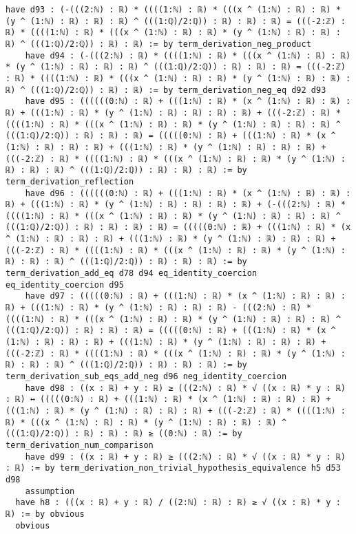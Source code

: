 \documentclass{article}
\begin{document}
\begin{tcolorbox}[colback=white!10, width=\linewidth]
\begin{lstlisting}[language=Lean4]
    have d93 : (-(((2:ℕ) : ℝ) * ((((1:ℕ) : ℝ) * (((x ^ (1:ℕ) : ℝ) : ℝ) * (y ^ (1:ℕ) : ℝ) : ℝ) : ℝ) ^ (((1:ℚ)/2:ℚ)) : ℝ) : ℝ) : ℝ) = (((-2:ℤ) : ℝ) * ((((1:ℕ) : ℝ) * (((x ^ (1:ℕ) : ℝ) : ℝ) * (y ^ (1:ℕ) : ℝ) : ℝ) : ℝ) ^ (((1:ℚ)/2:ℚ)) : ℝ) : ℝ) := by term_derivation_neg_product
    have d94 : (-(((2:ℕ) : ℝ) * ((((1:ℕ) : ℝ) * (((x ^ (1:ℕ) : ℝ) : ℝ) * (y ^ (1:ℕ) : ℝ) : ℝ) : ℝ) ^ (((1:ℚ)/2:ℚ)) : ℝ) : ℝ) : ℝ) = (((-2:ℤ) : ℝ) * ((((1:ℕ) : ℝ) * (((x ^ (1:ℕ) : ℝ) : ℝ) * (y ^ (1:ℕ) : ℝ) : ℝ) : ℝ) ^ (((1:ℚ)/2:ℚ)) : ℝ) : ℝ) := by term_derivation_neg_eq d92 d93
    have d95 : ((((((0:ℕ) : ℝ) + (((1:ℕ) : ℝ) * (x ^ (1:ℕ) : ℝ) : ℝ) : ℝ) + (((1:ℕ) : ℝ) * (y ^ (1:ℕ) : ℝ) : ℝ) : ℝ) : ℝ) + (((-2:ℤ) : ℝ) * ((((1:ℕ) : ℝ) * (((x ^ (1:ℕ) : ℝ) : ℝ) * (y ^ (1:ℕ) : ℝ) : ℝ) : ℝ) ^ (((1:ℚ)/2:ℚ)) : ℝ) : ℝ) : ℝ) = (((((0:ℕ) : ℝ) + (((1:ℕ) : ℝ) * (x ^ (1:ℕ) : ℝ) : ℝ) : ℝ) + (((1:ℕ) : ℝ) * (y ^ (1:ℕ) : ℝ) : ℝ) : ℝ) + (((-2:ℤ) : ℝ) * ((((1:ℕ) : ℝ) * (((x ^ (1:ℕ) : ℝ) : ℝ) * (y ^ (1:ℕ) : ℝ) : ℝ) : ℝ) ^ (((1:ℚ)/2:ℚ)) : ℝ) : ℝ) : ℝ) := by term_derivation_reflection
    have d96 : ((((((0:ℕ) : ℝ) + (((1:ℕ) : ℝ) * (x ^ (1:ℕ) : ℝ) : ℝ) : ℝ) + (((1:ℕ) : ℝ) * (y ^ (1:ℕ) : ℝ) : ℝ) : ℝ) : ℝ) + (-(((2:ℕ) : ℝ) * ((((1:ℕ) : ℝ) * (((x ^ (1:ℕ) : ℝ) : ℝ) * (y ^ (1:ℕ) : ℝ) : ℝ) : ℝ) ^ (((1:ℚ)/2:ℚ)) : ℝ) : ℝ) : ℝ) : ℝ) = (((((0:ℕ) : ℝ) + (((1:ℕ) : ℝ) * (x ^ (1:ℕ) : ℝ) : ℝ) : ℝ) + (((1:ℕ) : ℝ) * (y ^ (1:ℕ) : ℝ) : ℝ) : ℝ) + (((-2:ℤ) : ℝ) * ((((1:ℕ) : ℝ) * (((x ^ (1:ℕ) : ℝ) : ℝ) * (y ^ (1:ℕ) : ℝ) : ℝ) : ℝ) ^ (((1:ℚ)/2:ℚ)) : ℝ) : ℝ) : ℝ) := by term_derivation_add_eq d78 d94 eq_identity_coercion eq_identity_coercion d95
    have d97 : (((((0:ℕ) : ℝ) + (((1:ℕ) : ℝ) * (x ^ (1:ℕ) : ℝ) : ℝ) : ℝ) + (((1:ℕ) : ℝ) * (y ^ (1:ℕ) : ℝ) : ℝ) : ℝ) - (((2:ℕ) : ℝ) * ((((1:ℕ) : ℝ) * (((x ^ (1:ℕ) : ℝ) : ℝ) * (y ^ (1:ℕ) : ℝ) : ℝ) : ℝ) ^ (((1:ℚ)/2:ℚ)) : ℝ) : ℝ) : ℝ) = (((((0:ℕ) : ℝ) + (((1:ℕ) : ℝ) * (x ^ (1:ℕ) : ℝ) : ℝ) : ℝ) + (((1:ℕ) : ℝ) * (y ^ (1:ℕ) : ℝ) : ℝ) : ℝ) + (((-2:ℤ) : ℝ) * ((((1:ℕ) : ℝ) * (((x ^ (1:ℕ) : ℝ) : ℝ) * (y ^ (1:ℕ) : ℝ) : ℝ) : ℝ) ^ (((1:ℚ)/2:ℚ)) : ℝ) : ℝ) : ℝ) := by term_derivation_sub_eqs_add_neg d96 neg_identity_coercion
    have d98 : ((x : ℝ) + y : ℝ) ≥ (((2:ℕ) : ℝ) * √ ((x : ℝ) * y : ℝ) : ℝ) ↔ (((((0:ℕ) : ℝ) + (((1:ℕ) : ℝ) * (x ^ (1:ℕ) : ℝ) : ℝ) : ℝ) + (((1:ℕ) : ℝ) * (y ^ (1:ℕ) : ℝ) : ℝ) : ℝ) + (((-2:ℤ) : ℝ) * ((((1:ℕ) : ℝ) * (((x ^ (1:ℕ) : ℝ) : ℝ) * (y ^ (1:ℕ) : ℝ) : ℝ) : ℝ) ^ (((1:ℚ)/2:ℚ)) : ℝ) : ℝ) : ℝ) ≥ ((0:ℕ) : ℝ) := by term_derivation_num_comparison
    have d99 : ((x : ℝ) + y : ℝ) ≥ (((2:ℕ) : ℝ) * √ ((x : ℝ) * y : ℝ) : ℝ) := by term_derivation_non_trivial_hypothesis_equivalence h5 d53 d98
    assumption
  have h8 : (((x : ℝ) + y : ℝ) / ((2:ℕ) : ℝ) : ℝ) ≥ √ ((x : ℝ) * y : ℝ) := by obvious
  obvious

\end{lstlisting}
\end{tcolorbox}
\end{document}
